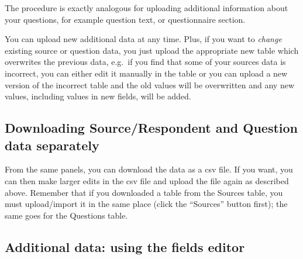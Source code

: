 \documentclass[
]{book}
\begin{document}
The procedure is exactly analogous for uploading additional information about your questions, for example question text, or questionnaire section.

You can upload new additional data at any time. Plus, if you want to \emph{change} existing source or question data, you just upload the appropriate new table which overwrites the previous data, e.g.~if you find that some of your sources data is incorrect, you can either edit it manually in the table or you can upload a new version of the incorrect table and the old values will be overwritten and any new values, including values in new fields, will be added.

\hypertarget{downloading-sourcerespondent-and-question-data-separately}{%
\subsection{Downloading Source/Respondent and Question data separately}\label{downloading-sourcerespondent-and-question-data-separately}}

From the same panels, you can download the data as a csv file. If you want, you can then make larger edits in the csv file and upload the file again as described above. Remember that if you downloaded a table from the Sources table, you must upload/import it in the same place (click the ``Sources'' button first); the same goes for the Questions table.

\hypertarget{additional-data-using-the-fields-editor}{%
\subsection{Additional data: using the fields editor}\label{additional-data-using-the-fields-editor}}
\end{document}
